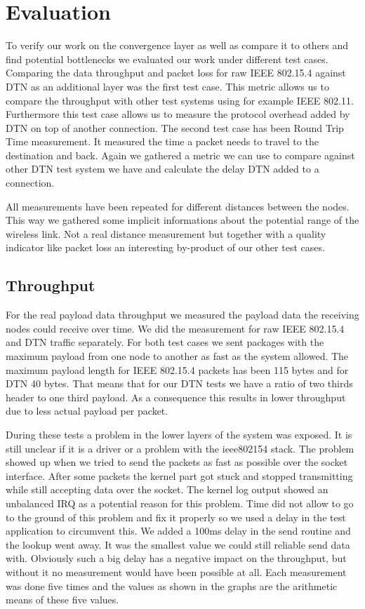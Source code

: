 \chapter{Evaluation}
To verify our work on the convergence layer as well as compare it to others and
find potential bottlenecks we evaluated our work under different test cases.
Comparing the data throughput and packet loss for raw IEEE 802.15.4 against DTN
as an additional layer was the first test case. This metric allows us to compare
the throughput with other test systems using for example IEEE 802.11.
Furthermore this test case allows us to measure the protocol overhead added by
DTN on top of another connection. The second test case has been Round Trip Time
measurement. It measured the time a packet needs to travel to the destination
and back. Again we gathered a metric we can use to compare against other DTN
test system we have and calculate the delay DTN added to a connection.

All measurements have been repeated for different distances between the nodes.
This way we gathered some implicit informations about the potential range of the
wireless link. Not a real distance measurement but together with a quality
indicator like packet loss an interesting by-product of our other test cases.

\section{Throughput}
For the real payload data throughput we measured the payload data the receiving
nodes could receive over time. We did the measurement for raw IEEE 802.15.4 and
DTN traffic separately. For both test cases we sent packages with the maximum
payload from one node to another as fast as the system allowed. The maximum
payload length for IEEE 802.15.4 packets has been 115 bytes and for DTN 40 bytes.
That means that for our DTN tests we have a ratio of two thirds header to one
third payload. As a consequence this results in lower throughput due to less
actual payload per packet.

During these tests a problem in the lower layers of the system was exposed. It is
still unclear if it is a driver or a problem with the ieee802154 stack. The
problem showed up when we tried to send the packets as fast as possible over the
socket interface. After some packets the kernel part got stuck and stopped
transmitting while still accepting data over the socket. The kernel log output
showed an unbalanced IRQ as a potential reason for this problem. Time did not allow
to go to the ground of this problem and fix it properly so we used a delay
in the test application to circumvent this. We added a 100ms delay in the send
routine and the lookup went away. It was the smallest value we could still
reliable send data with. Obviously such a big delay has a negative impact on the
throughput, but without it no measurement would have been possible at all. Each
measurement was done five times and the values as shown in the graphs are the
arithmetic means of these five values.

